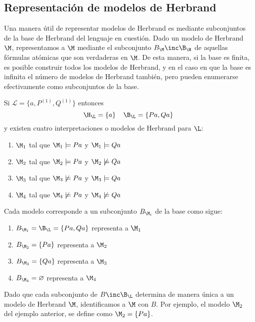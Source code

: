 \documentclass[11pt,letterpaper]{article}
\begin{document}
\subsection{Representaci\'on de modelos de Herbrand}

Una manera \'util de representar modelos de Herbrand es mediante subconjuntos de
la base de Herbrand del lenguaje en cuesti\'on. Dado un modelo de Herbrand 
$\M$, representamos a $\M$ mediante el subconjunto $B_\M\inc\B_\H$ de aquellas 
f\'ormulas at\'omicas que son verdaderas en $\M$. De esta manera, si la base es 
finita, es posible construir todos los modelos de Herbrand, y en el caso en que 
la base es infinita el n\'umero de modelos de Herbrand tambi\'en, pero pueden 
enumerarse efectivamente como subconjuntos de la base.

\beje
Si $\mathcal{L}=\{a, P^{(1)},Q^{(1)}\}$ entonces 
\[
\H_\L=\{a\}\;\;\;\;\B_\L=\{Pa,Qa\}
\]
y existen cuatro interpretaciones o modelos de Herbrand para $\L$:
\begin{enumerate}
\item $\M_1$ tal que $\M_1\models Pa$ y $\M_1\models Qa$
\item $\M_2$ tal que $\M_2\models Pa$ y $\M_2\not\models Qa$
\item $\M_3$ tal que $\M_3\not\models Pa$ y $\M_3\models Qa$
\item $\M_4$ tal que $\M_4\not\models Pa$ y $\M_4\not\models Qa$
\end{enumerate}
Cada modelo corresponde a un subconjunto $B_{\M_i}$ de la base como sigue:
\begin{enumerate}
\item $B_{\M_1}=\B_\L=\{Pa,Qa\}$ representa a $\M_1$
\item $B_{\M_2}=\{Pa\}$ representa a $\M_2$
\item $B_{\M_3}=\{Qa\}$ representa a $\M_3$
\item $B_{\M_4}=\varnothing$ representa a $\M_4$

\end{enumerate}
\eeje

Dado que cada subconjunto de $B\inc \B_\L$ determina de manera \'unica a un 
modelo de Herbrand $\M$,  identificamos a $\M$ con $B$. Por ejemplo, el modelo 
$\M_2$ del ejemplo anterior, se define como $\M_2=\{Pa\}$.
\end{document}
